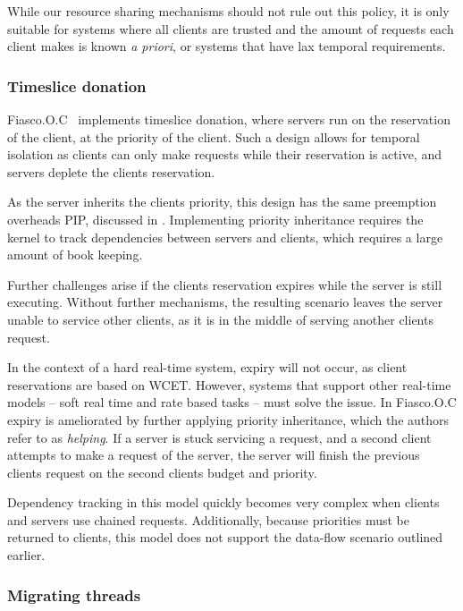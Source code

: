 While our resource sharing mechanisms should not rule out this policy, it is only suitable for systems where all clients are trusted and the amount of requests each client makes is known \emph{a priori}, or systems that have lax temporal requirements.

\subsubsection{Timeslice donation}

Fiasco.O.C~\citep{Steinberg_BK_10} implements timeslice donation, where servers run on the reservation of the client, at the priority of the client.
Such a design allows for temporal isolation as clients can only make requests while their reservation is active, and servers deplete the clients reservation.

As the server inherits the clients priority, this design has the same preemption overheads \gls{PIP}, discussed in .
Implementing priority inheritance requires the kernel to track dependencies between servers and clients, which requires a large amount of book keeping.

Further challenges arise if the clients reservation expires while the server is still executing.
Without further mechanisms, the resulting scenario leaves the server unable to service other clients, as it is in the middle of serving another clients request.

In the context of a hard real-time system, expiry will not occur, as client reservations are based on \gls{WCET}.
However, systems that support other real-time models -- soft real time and rate based tasks --  must solve the issue.
In Fiasco.O.C expiry is ameliorated by further applying priority inheritance, which the authors refer to as \emph{helping}.
If a server is stuck servicing a request, and a second client attempts to make a request of the server, the server will finish the previous clients request on the second clients budget and priority.

Dependency tracking in this model quickly becomes very complex when clients and servers use chained requests.
Additionally, because priorities must be returned to clients, this model does not support the data-flow scenario outlined earlier.

\subsubsection{Migrating threads}

